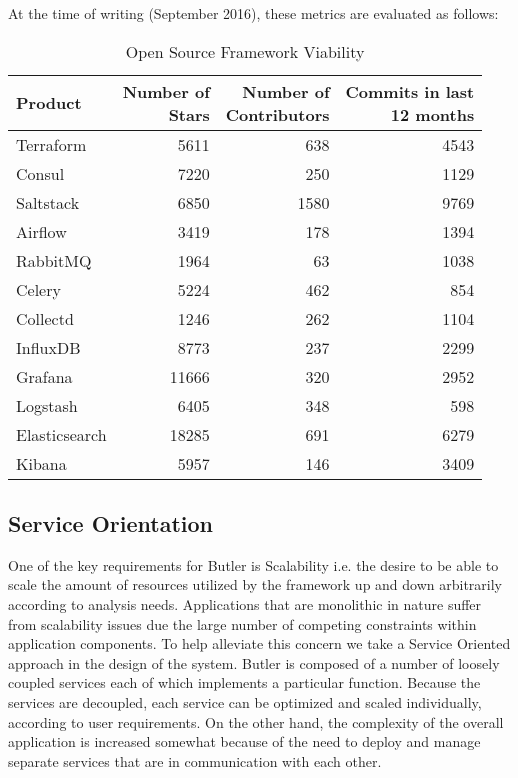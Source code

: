 At the time of writing (September 2016), these metrics are evaluated as follows:

\begin{table}[]
\label{tab:open_source_framework_viability}
\renewcommand{\arraystretch}{1.2} 
\centering
\caption{Open Source Framework Viability}
\begin{tabular}{@{}lrrr@{}}
\toprule
Product & \pbox{5cm}{Number of\\ Stars} & \pbox{5cm}{Number of\\ Contributors} & \pbox{5cm}{Commits in last\\ 12 months}\\
\midrule
Terraform & 5611 & 638 & 4543 \\
Consul & 7220 & 250 & 1129\\
Saltstack & 6850 & 1580 & 9769 \\
Airflow & 3419 & 178 & 1394\\
RabbitMQ  & 1964 & 63 & 1038\\
Celery & 5224 & 462 & 854\\
Collectd  & 1246 & 262 & 1104\\
InfluxDB & 8773 & 237 & 2299\\
Grafana  & 11666 & 320 & 2952\\
Logstash & 6405 & 348 & 598\\
Elasticsearch & 18285 & 691 & 6279\\
Kibana  & 5957 & 146 & 3409\\
\bottomrule
\end{tabular}
\end{table}

\subsection {Service Orientation}

One of the key requirements for Butler is Scalability i.e. the desire to be able to scale the amount of resources utilized by the framework up and down arbitrarily according to analysis needs. Applications that are monolithic in nature suffer from scalability issues due the large number of competing constraints within application components. To help alleviate this concern we take a Service Oriented approach in the design of the system. Butler is composed of a number of loosely coupled services each of which implements a particular function. Because the services are decoupled, each service can be optimized and scaled individually, according to user requirements. On the other hand, the complexity of the overall application is increased somewhat because of the need to deploy and manage separate services that are in communication with each other.

